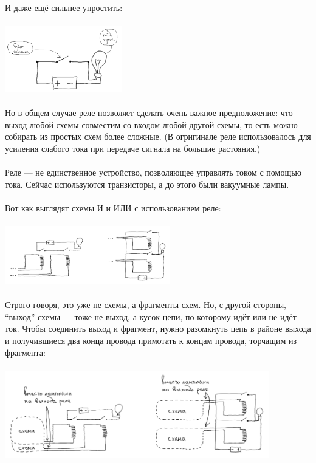 \documentclass[11pt]{book}
\begin{document}
\\ \\
И даже ещё сильнее упростить:
\\ \\
\includegraphics[width=2in]{pic/14.png}
\\ \\
Но в общем случае реле позволяет сделать очень важное предположение:
что выход любой схемы совместим со входом любой другой схемы,
то есть можно собирать из простых схем более сложные.
(В огригинале реле использовалось для усиления слабого тока при передаче сигнала на большие растояния.)
\\ \\
Реле --- не единственное устройство, позволяющее управлять током с помощью тока.
Сейчас используются транзисторы, а до этого были вакуумные лампы.
\\ \\
Вот как выглядят схемы И и ИЛИ с использованием реле:
\\ \\
\includegraphics[height=1in]{pic/15.png}
\\ \\
Строго говоря, это уже не схемы, а фрагменты схем. Но, с другой стороны, ``выход'' схемы ---
тоже не выход, а кусок цепи, по которому идёт или не идёт ток. Чтобы соединить выход
и фрагмент, нужно разомкнуть цепь в районе выхода и получившиеся два конца провода примотать
к концам провода, торчащим из фрагмента:
\\ \\
\includegraphics[height=1.5in]{pic/16.png}
\end{document}
